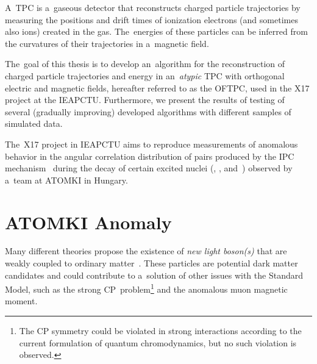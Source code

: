 \setcounter{equation}{0}
\setcounter{figure}{0}
\renewcommand{\theequation}{\thechapter.\arabic{equation}}
\renewcommand{\thefigure}{\thechapter.\arabic{figure}}
	A~\ac{TPC}\red{~[refs]} is a~gaseous detector that reconstructs charged particle trajectories by measuring the positions and drift times of ionization electrons (and sometimes also ions) created in the gas. The~energies of these particles can be inferred from the curvatures of their trajectories in a~magnetic field.
	
	The~goal of this thesis is to develop an~algorithm for the reconstruction of charged particle trajectories and energy in an~\emph{atypic} \ac{TPC} with orthogonal electric and magnetic fields, hereafter referred to as the \ac{OFTPC}, used in the X17 project at the \ac{IEAPCTU}. Furthermore, we present the results of testing of several (gradually improving) developed algorithms with different samples of simulated data.
	
	The~X17 project in \ac{IEAPCTU} aims to reproduce measurements of anomalous behavior in the angular correlation distribution of pairs produced by the \ac{IPC} mechanism~\cite{IPC} during the decay of certain excited nuclei (, , and~) observed by a~team at ATOMKI in Hungary.
	
	
	\section{ATOMKI Anomaly}
	\label{sec:ATOMKI}
		Many different theories propose the existence of \emph{new light boson(s)} that are weakly coupled to ordinary matter~\cite{dark}. These particles are potential dark matter candidates and could contribute to a~solution of other issues with the Standard Model, such as the strong CP~problem\footnote{The CP symmetry could be violated in strong interactions according to the current formulation of quantum chromodynamics, but no such violation is observed.} and the anomalous muon magnetic moment.
		
